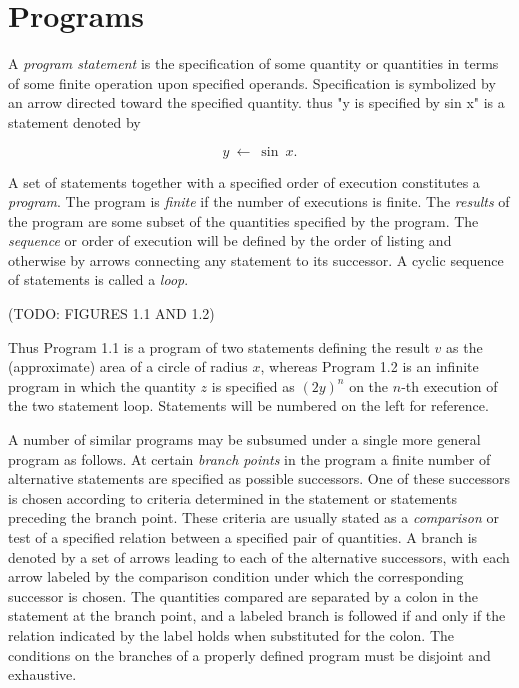 \section{Programs}

\par A \textit{program statement} is the specification of some quantity or quantities in terms of some finite operation upon specified operands. Specification is symbolized by an arrow directed toward the specified quantity. thus "y is specified by sin x" is a statement denoted by

$$
      y\ ←\ \sin \ x.
$$

\par A set of statements together with a specified order of execution constitutes a \textit{program}. The program is \textit{finite} if the number of executions is finite. The \textit{results} of the program are some subset of the quantities specified by the program. The \textit{sequence} or order of execution will be defined by the order of listing and otherwise by arrows connecting any statement to its successor. A cyclic sequence of statements is called a \textit{loop}.

\par (TODO: FIGURES 1.1 AND 1.2)

\par Thus Program 1.1 is a program of two statements defining the result $v$ as the (approximate) area of a circle of radius $x$, whereas Program 1.2 is an infinite program in which the quantity $z$ is specified as $(2y)^n$ on the $n$-th execution of the two statement loop. Statements will be numbered on the left for reference.

\par A number of similar programs may be subsumed under a single more general program as follows. At certain \textit{branch points} in the program a finite number of alternative statements are specified as possible successors. One of these successors is chosen according to criteria determined in the statement or statements preceding the branch point. These criteria are usually stated as a \textit{comparison} or test of a specified relation between a specified pair of quantities. A branch is denoted by a set of arrows leading to each of the alternative successors, with each arrow labeled by the comparison condition under which the corresponding successor is chosen. The quantities compared are separated by a colon in the statement at the branch point, and a labeled branch is followed if and only if the relation indicated by the label holds when substituted for the colon. The conditions on the branches of a properly defined program must be disjoint and exhaustive.

